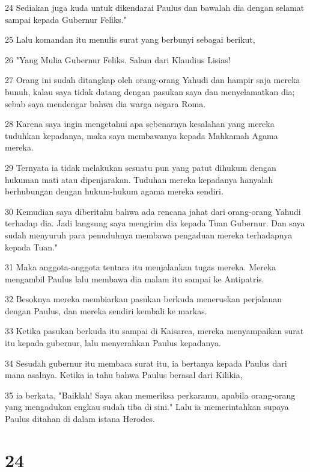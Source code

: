\par 24 Sediakan juga kuda untuk dikendarai Paulus dan bawalah dia dengan selamat sampai kepada Gubernur Feliks."
\par 25 Lalu komandan itu menulis surat yang berbunyi sebagai berikut,
\par 26 "Yang Mulia Gubernur Feliks. Salam dari Klaudius Lisias!
\par 27 Orang ini sudah ditangkap oleh orang-orang Yahudi dan hampir saja mereka bunuh, kalau saya tidak datang dengan pasukan saya dan menyelamatkan dia; sebab saya mendengar bahwa dia warga negara Roma.
\par 28 Karena saya ingin mengetahui apa sebenarnya kesalahan yang mereka tuduhkan kepadanya, maka saya membawanya kepada Mahkamah Agama mereka.
\par 29 Ternyata ia tidak melakukan sesuatu pun yang patut dihukum dengan hukuman mati atau dipenjarakan. Tuduhan mereka kepadanya hanyalah berhubungan dengan hukum-hukum agama mereka sendiri.
\par 30 Kemudian saya diberitahu bahwa ada rencana jahat dari orang-orang Yahudi terhadap dia. Jadi langsung saya mengirim dia kepada Tuan Gubernur. Dan saya sudah menyuruh para penuduhnya membawa pengaduan mereka terhadapnya kepada Tuan."
\par 31 Maka anggota-anggota tentara itu menjalankan tugas mereka. Mereka mengambil Paulus lalu membawa dia malam itu sampai ke Antipatris.
\par 32 Besoknya mereka membiarkan pasukan berkuda meneruskan perjalanan dengan Paulus, dan mereka sendiri kembali ke markas.
\par 33 Ketika pasukan berkuda itu sampai di Kaisarea, mereka menyampaikan surat itu kepada gubernur, lalu menyerahkan Paulus kepadanya.
\par 34 Sesudah gubernur itu membaca surat itu, ia bertanya kepada Paulus dari mana asalnya. Ketika ia tahu bahwa Paulus berasal dari Kilikia,
\par 35 ia berkata, "Baiklah! Saya akan memeriksa perkaramu, apabila orang-orang yang mengadukan engkau sudah tiba di sini." Lalu ia memerintahkan supaya Paulus ditahan di dalam istana Herodes.

\chapter{24}

